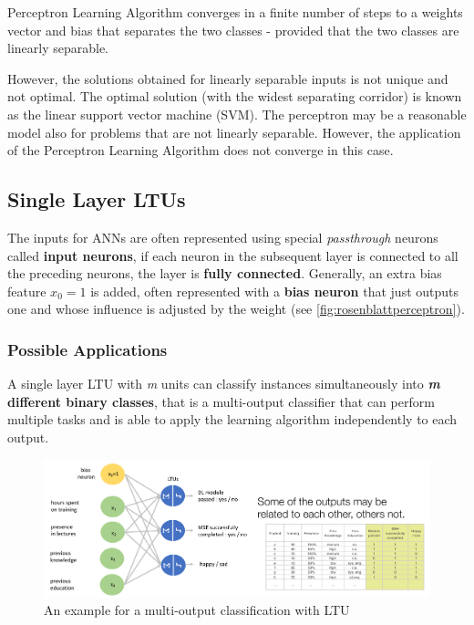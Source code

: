 \documentclass[11pt]{article}
\begin{document}
\begin{theorem}
	Perceptron Learning Algorithm converges in a finite number of steps to a weights vector and bias that separates the two classes - provided that the two classes are linearly separable.
\end{theorem}

However, the solutions obtained for linearly separable inputs is not unique and not optimal. The optimal solution (with the widest separating corridor) is known as the linear support vector machine (SVM). The perceptron may be a reasonable model also for problems that are not linearly separable. However, the application of the Perceptron Learning Algorithm does not converge in this case.

\subsection{Single Layer LTUs}
The inputs for ANNs are often represented using special \emph{passthrough} neurons called \textbf{input neurons}, if each neuron in the subsequent layer is connected to all the preceding neurons, the layer is \textbf{fully connected}. Generally, an extra bias feature $x_0 = 1$ is added, often represented with a \textbf{bias neuron} that just outputs one and whose influence is adjusted by the weight (see \ref{fig:rosenblattperceptron}).

\subsubsection{Possible Applications}
A single layer LTU with \emph{m} units can classify instances simultaneously into \textbf{\emph{m} different binary classes}, that is a multi-output classifier that can perform multiple tasks and is able to apply the learning algorithm independently to each output.

\begin{figure}[htb]
	\centering
	\includegraphics[width=0.8\linewidth, keepaspectratio]{img/multioutput_binary_classifier}
	\caption{An example for a multi-output classification with LTU}
	\label{fig:multioutputbinaryclassifier}
\end{figure}
\end{document}
